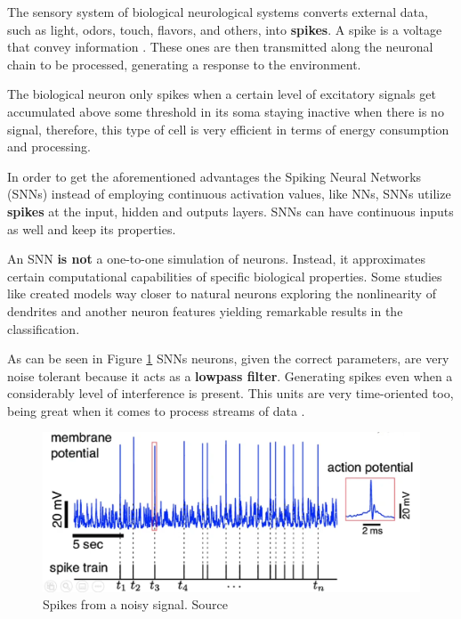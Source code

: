 		\par The sensory system of biological neurological systems converts external data, such as light, odors, touch, flavors, and others, into \textbf{spikes}. A spike is a voltage that convey information \cite{kasabov2019time}. These ones are then transmitted along the neuronal chain to be processed, generating a response to the environment.
		
		\par The biological neuron only spikes when a certain level of excitatory signals get accumulated above some threshold in its soma staying inactive when there is no signal, therefore, this type of cell is very efficient in terms of energy consumption and processing.
		
		\par In order to get the aforementioned advantages the Spiking Neural Networks (SNNs) instead of employing continuous activation values, like NNs, SNNs utilize \textbf{spikes} at the input, hidden and outputs layers. SNNs can have continuous inputs as well and keep its properties.
		
		
		\par An SNN \textbf{is not} a one-to-one simulation of neurons. Instead, it approximates certain computational capabilities of specific biological properties. Some studies like \cite{jones2020single} created models way closer to natural neurons exploring the nonlinearity of dendrites and another neuron features yielding remarkable results in the classification.
		
			\par As can be seen in Figure \ref{fig:neuronspike} SNNs neurons, given the correct parameters, are very noise tolerant because it acts as a \textbf{lowpass filter}. Generating spikes even when a considerably level of interference is present. This units are very time-oriented too, being great when it comes to process streams of data \cite{10242251}.

			\begin{figure}[H]
				\centering
				\includegraphics[width=.88\linewidth]{images/neuronSpikes}
				\caption{Spikes from a noisy signal. Source \cite{dan_goodman_2022_7044500}}
				\label{fig:neuronspike}
			\end{figure} 


